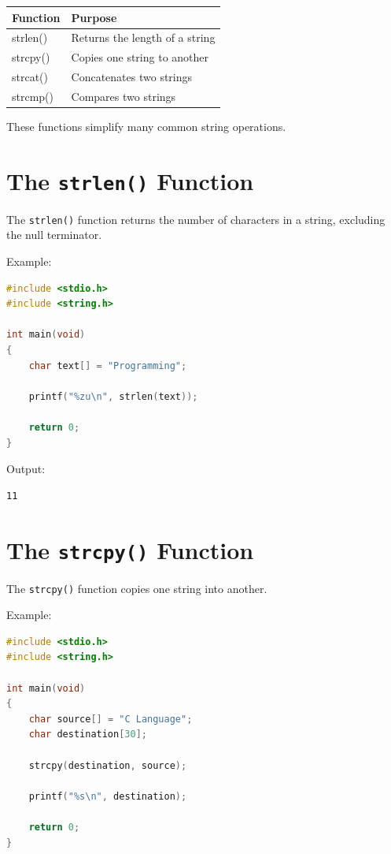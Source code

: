 \documentclass[12pt,openany]{book}
\begin{document}
\begin{center}
\begin{tabular}{|l|l|}
\hline
Function & Purpose \\
\hline
strlen() & Returns the length of a string \\
strcpy() & Copies one string to another \\
strcat() & Concatenates two strings \\
strcmp() & Compares two strings \\
\hline
\end{tabular}
\end{center}

These functions simplify many common string operations.
\section{The \texttt{strlen()} Function}

The \texttt{strlen()} function returns the number of characters in a string, excluding the null terminator.

Example:

\begin{lstlisting}[language=C]
#include <stdio.h>
#include <string.h>

int main(void)
{
    char text[] = "Programming";

    printf("%zu\n", strlen(text));

    return 0;
}
\end{lstlisting}

Output:

\begin{lstlisting}
11
\end{lstlisting}

\section{The \texttt{strcpy()} Function}

The \texttt{strcpy()} function copies one string into another.

Example:

\begin{lstlisting}[language=C]
#include <stdio.h>
#include <string.h>

int main(void)
{
    char source[] = "C Language";
    char destination[30];

    strcpy(destination, source);

    printf("%s\n", destination);

    return 0;
}
\end{lstlisting}
\end{document}
